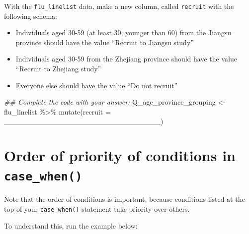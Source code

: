 \documentclass[
  letterpaper,
  DIV=11,
  numbers=noendperiod]{scrreprt}
\newenvironment{Shaded}{\begin{snugshade}}{\end{snugshade}}
\newcommand{\AttributeTok}[1]{\textcolor[rgb]{0.40,0.45,0.13}{#1}}
\newcommand{\DocumentationTok}[1]{\textcolor[rgb]{0.37,0.37,0.37}{\textit{#1}}}
\newcommand{\FunctionTok}[1]{\textcolor[rgb]{0.28,0.35,0.67}{#1}}
\newcommand{\NormalTok}[1]{\textcolor[rgb]{0.00,0.23,0.31}{#1}}
\newcommand{\OtherTok}[1]{\textcolor[rgb]{0.00,0.23,0.31}{#1}}
\newcommand{\SpecialCharTok}[1]{\textcolor[rgb]{0.37,0.37,0.37}{#1}}
\providecommand{\tightlist}{%
  \setlength{\itemsep}{0pt}\setlength{\parskip}{0pt}}\usepackage{longtable,booktabs,array}
\begin{document}
\begin{tcolorbox}[enhanced jigsaw, titlerule=0mm, colback=white, left=2mm, breakable, opacitybacktitle=0.6, colbacktitle=quarto-callout-tip-color!10!white, colframe=quarto-callout-tip-color-frame, bottomtitle=1mm, opacityback=0, coltitle=black, arc=.35mm, toptitle=1mm, title=\textcolor{quarto-callout-tip-color}{\faLightbulb}\hspace{0.5em}{Practice}, leftrule=.75mm, toprule=.15mm, bottomrule=.15mm, rightrule=.15mm]

With the \texttt{flu\_linelist} data, make a new column, called
\texttt{recruit} with the following schema:

\begin{itemize}
\tightlist
\item
  Individuals aged 30-59 (at least 30, younger than 60) from the Jiangsu
  province should have the value ``Recruit to Jiangsu study''
\item
  Individuals aged 30-59 from the Zhejiang province should have the
  value ``Recruit to Zhejiang study''
\item
  Everyone else should have the value ``Do not recruit''
\end{itemize}

\begin{Shaded}
\begin{Highlighting}[]
\DocumentationTok{\#\# Complete the code with your answer:}
\NormalTok{Q\_age\_province\_grouping }\OtherTok{\textless{}{-}} 
\NormalTok{  flu\_linelist }\SpecialCharTok{\%\textgreater{}\%} 
  \FunctionTok{mutate}\NormalTok{(}\AttributeTok{recruit =}\NormalTok{ \_\_\_\_\_\_\_\_\_\_\_\_\_\_\_\_\_\_\_\_\_\_\_\_\_\_\_\_\_\_)}
\end{Highlighting}
\end{Shaded}

\end{tcolorbox}

\section{\texorpdfstring{Order of priority of conditions in
\texttt{case\_when()}}{Order of priority of conditions in case\_when()}}\label{order-of-priority-of-conditions-in-case_when}

Note that the order of conditions is important, because conditions
listed at the top of your \texttt{case\_when()} statement take priority
over others.

To understand this, run the example below:
\end{document}
